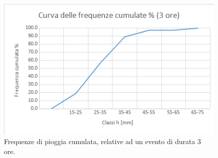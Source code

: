 \begin{figure}[H]\centering
        \includegraphics[scale=.6]{immagini/freq_piogg_cum_3ore.png}
        \caption{Frequenze di pioggia cumulata, relative ad un evento di durata 3 ore.}
      \label{freq_cum_piogg_05ore}
\end{figure}

